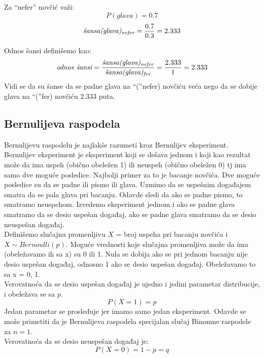 \documentclass[a4paper,12pt]{report}
\begin{document}
 Za \enquote{nefer} novčić važi: 
  \begin{equation}
	P(glava) = 0.7
 \end{equation}
 \begin{equation}
	\textit{šansa(glava)\textsubscript{nefer}} = \frac{0.7}{0.3} = 2.333
 \end{equation}
 
 Odnos šansi definišemo kao: 
  \begin{equation}
	 \textit{odnos šansi} = \frac{\textit{šansa(glava)\textsubscript{nefer}}}{\textit{šansa(glava)\textsubscript{fer}}} = \frac{2.333}{1} = 2.333
 \end{equation}
 Vidi se da su šanse da se padne glava na \enquote(nefer) novčiću veća nego da se dobije glava na \enquote(fer) novčiću 2.333 puta. 
\subsection{Bernulijeva raspodela}

Bernulijevu raspodelu je najlakše razumeti kroz Bernulijev eksperiment. Bernulijev eksperiment je eksperiment koji se dešava jednom i koji kao rezultat može da ima uspeh (obično obeležen 1) ili neuspeh (obično obeležen 0) tj ima samo dve moguće posledice. Najbolji primer za to je bacanje novčića. Dve moguće posledice su da se padne ili pismo ili glava. Uzmimo da se uspešnim događajem smatra da se pala glava pri bacanju. Odavde sledi da ako se padne pismo, to smatramo neuspehom. Izvedemo eksperiment jednom i ako se padne glava smatramo da se desio uspešan događaj, ako se padne glava smatramo da se desio neuspešan događaj. \\

Definišemo slučajnu promenljivu $X$ = broj uspeha pri bacanju novčića i $X \sim Bernoulli(p)$. Moguće vrednosti koje slučajna promenljiva može da ima (obeležavamo ih sa x) su 0 ili 1. Nula se dobija ako se pri jednom bacanju nije desio uspešan događaj, odnosno 1 ako se desio uspešan događaj.  Obeležavamo to sa x = 0, 1. \\
Verovatnoća da se desio uspešan događaj je ujedno i jedini parametar distribucije, i obeležava se sa $p$.
  \begin{equation}
	 P(X = 1) = p 
 \end{equation}
Jedan parametar se prosleđuje jer imamo samo jedan eksperiment. Odavde se može primetiti da je Bernulijeva raspodela specijalan slučaj Binomne raspodele za $n = 1$.\\
Verovatnoća da se desio neuspešan događaj je:
\begin{equation}
	 P(X = 0) = 1-p = q 
 \end{equation}
\end{document}
